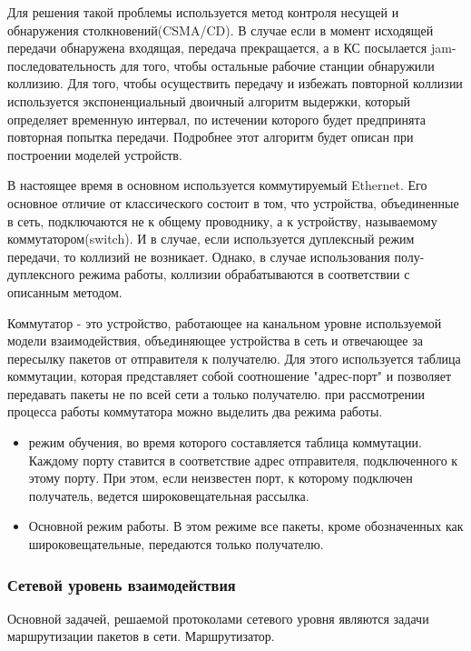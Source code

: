     Для решения такой проблемы используется метод контроля несущей и обнаружения столкновений(CSMA/CD). В случае если в момент исходящей передачи обнаружена входящая, передача прекращается, а в КС посылается jam-последовательность для того, чтобы остальные рабочие станции обнаружили коллизию. Для того, чтобы осуществить передачу и избежать повторной коллизии используется экспоненциальный двоичный алгоритм выдержки, который определяет временную интервал, по истечении которого будет предпринята повторная попытка передачи. Подробнее этот алгоритм будет описан при построении моделей устройств.

    В настоящее время в основном используется коммутируемый Ethernet. Его основное отличие от классического состоит в том, что устройства, объединенные в сеть, подключаются не к общему проводнику, а к устройству, называемому коммутатором(switch). И в случае, если используется дуплексный режим передачи, то коллизий не возникает. Однако, в случае использования полу-дуплексного режима работы, коллизии обрабатываются в соответствии с описанным методом.

    Коммутатор - это устройство, работающее на канальном уровне используемой модели взаимодействия, объединяющее устройства в сеть и отвечающее за пересылку пакетов от отправителя к получателю. Для этого используется таблица коммутации, которая представляет собой соотношение "адрес-порт" и позволяет передавать пакеты не по всей сети а только получателю. при рассмотрении процесса работы коммутатора можно выделить два режима работы.

    \begin{itemize}
        \item режим обучения, во время которого составляется таблица коммутации. Каждому порту ставится в соответствие адрес отправителя, подключенного к этому порту. При этом, если неизвестен порт, к которому подключен получатель, ведется широковещательная рассылка.
        \item Основной режим работы. В этом режиме все пакеты, кроме обозначенных как широковещательные, передаются только получателю.
    \end{itemize}

    \subsubsection{Сетевой уровень взаимодействия }

    Основной задачей, решаемой протоколами сетевого уровня являются задачи маршрутизации пакетов в сети.
    Маршрутизатор.


